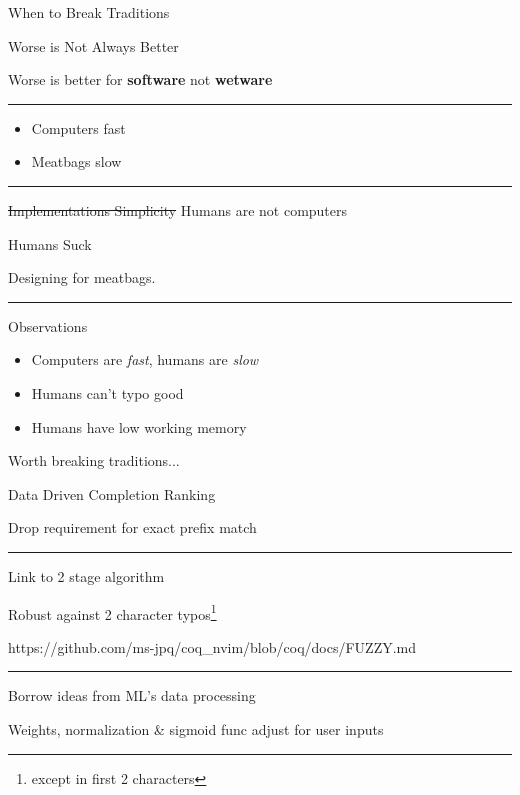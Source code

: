 \documentclass{beamer}
\begin{document}
\begin{frame}[standout]

	When to Break Traditions

\end{frame}


\begin{frame}{Worse is Not Always Better}

	Worse is better for \textbf{software} not \textbf{wetware}

	\rule{\textwidth}{0.1em}

	\begin{itemize}

		\item Computers fast

		\item Meatbags slow

	\end{itemize}

	\rule{\textwidth}{0.1em}

	\st{Implementations Simplicity} Humans are not computers

\end{frame}


\begin{frame}{Humans Suck}

	Designing for meatbags.

	\rule{\textwidth}{0.1em}

	\begin{block}{Observations}

		\begin{itemize}

			\item Computers are \textit{fast}, humans are \textit{slow}

			\item Humans can't typo good

			\item Humans have low working memory

		\end{itemize}

	\end{block}

	Worth breaking traditions...

\end{frame}


\begin{frame}{Data Driven Completion Ranking}

	Drop requirement for exact prefix match

	\rule{\textwidth}{0.1em}

	Link to 2 stage algorithm

	Robust against 2 character typos\footnote{except in first 2 characters}

	https://github.com/ms-jpq/coq\_nvim/blob/coq/docs/FUZZY.md

	\rule{\textwidth}{0.1em}

	Borrow ideas from ML's data processing

	Weights, normalization \& sigmoid func adjust for user inputs

\end{frame}
\end{document}
